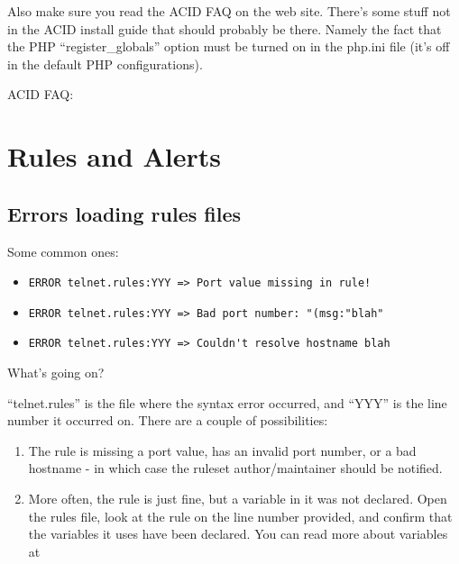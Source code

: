 \documentclass{article}
\begin{document}
Also make sure you read the ACID FAQ on the web site. There's some stuff not in
the ACID install guide that should probably be there. Namely the fact that the
PHP ``register\_globals'' option must be turned on in the php.ini file (it's off
in the default PHP configurations).

ACID FAQ: 

\section{Rules and Alerts}

\subsection{Errors loading rules files}

Some common ones:

\begin{itemize}
\item \begin{verbatim}ERROR telnet.rules:YYY => Port value missing in rule!\end{verbatim}
\item \begin{verbatim}ERROR telnet.rules:YYY => Bad port number: "(msg:"blah"\end{verbatim}
\item \begin{verbatim}ERROR telnet.rules:YYY => Couldn't resolve hostname blah\end{verbatim}
\end{itemize}

What's going on?

``telnet.rules'' is the file where the syntax error occurred, and ``YYY'' is the 
line number it occurred on.  There are a couple of possibilities:

\begin{enumerate}
\item The rule is missing a port value, has an invalid port number, or a bad hostname - in which case the ruleset author/maintainer should be notified.

\item More often, the rule is just fine, but a variable in it was not declared.  Open the rules file, look at the rule on the line number provided, and confirm that the variables it uses have been declared.  You can read more about variables at 
\end{enumerate}
\end{document}
